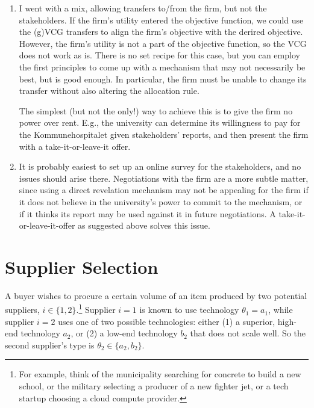 \documentclass[a4paper]{article}
\begin{document}
\begin{enumerate}
	\item I went with a mix, allowing transfers to/from the firm, but not the stakeholders. If the firm's utility entered the objective function, we could use the (g)VCG transfers to align the firm's objective with the derired objective. However, the firm's utility is not a part of the objective function, so the VCG does not work as is. There is no set recipe for this case, but you can employ the first principles to come up with a mechanism that may not necessarily be best, but is good enough. In particular, the firm must be unable to change its transfer without also altering the allocation rule. 
	
	The simplest (but not the only!) way to achieve this is to give the firm no power over rent. E.g., the university can determine its willingness to pay for the Kommunehospitalet given stakeholders' reports, and then present the firm with a take-it-or-leave-it offer.
	
	\item It is probably easiest to set up an online survey for the stakeholders, and no issues should arise there. Negotiations with the firm are a more subtle matter, since using a direct revelation mechanism may not be appealing for the firm if it does not believe in the university's power to commit to the mechanism, or if it thinks its report may be used against it in future negotiations. A take-it-or-leave-it-offer as suggested above solves this issue. 
\end{enumerate}

\fi



\section{Supplier Selection}

A buyer wishes to procure a certain volume of an item produced by two potential suppliers, $i \in \{1,2\}$.\footnote{For example, think of the municipality searching for concrete to build a new school, or the military selecting a producer of a new fighter jet, or a tech startup choosing a cloud compute provider.} 
Supplier $i=1$ is known to use technology $\theta_1 = a_1$, while supplier $i=2$ uses one of two possible technologies: either (1) a superior, high-end technology $a_2$, or (2) a low-end technology $b_2$ that does not scale well. So the second supplier's type is $\theta_2 \in \{a_2, b_2\}$.
\end{document}
